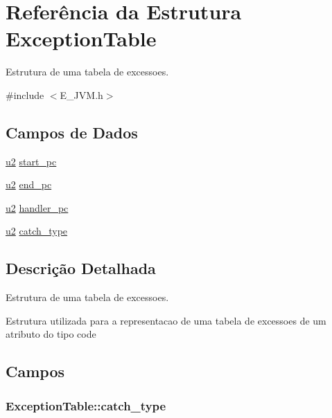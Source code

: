 \hypertarget{struct_exception_table}{}\section{Referência da Estrutura Exception\+Table}
\label{struct_exception_table}


Estrutura de uma tabela de excessoes.  




{\ttfamily \#include $<$E\+\_\+\+J\+V\+M.\+h$>$}

\subsection*{Campos de Dados}
\begin{DoxyCompactItemize}
\item 
\hyperlink{_e___j_v_m_8h_a5f223212eef04d10a4550ded680cb1cf}{u2} \hyperlink{struct_exception_table_af137b3a966825f91146039797d3b1ba5}{start\+\_\+pc}
\item 
\hyperlink{_e___j_v_m_8h_a5f223212eef04d10a4550ded680cb1cf}{u2} \hyperlink{struct_exception_table_ac2df73606ebe48af50a629f83fe9c677}{end\+\_\+pc}
\item 
\hyperlink{_e___j_v_m_8h_a5f223212eef04d10a4550ded680cb1cf}{u2} \hyperlink{struct_exception_table_a664ec4b395e02d3a5bfa6cef3493c1e7}{handler\+\_\+pc}
\item 
\hyperlink{_e___j_v_m_8h_a5f223212eef04d10a4550ded680cb1cf}{u2} \hyperlink{struct_exception_table_a440736a74baddb4197715e85ef73b836}{catch\+\_\+type}
\end{DoxyCompactItemize}


\subsection{Descrição Detalhada}
Estrutura de uma tabela de excessoes. 

Estrutura utilizada para a representacao de uma tabela de excessoes de um atributo do tipo code 

\subsection{Campos}
\hypertarget{struct_exception_table_a440736a74baddb4197715e85ef73b836}{}
\subsubsection[{catch\+\_\+type}]{ Exception\+Table\+::catch\+\_\+type}\label{struct_exception_table_a440736a74baddb4197715e85ef73b836}
\hypertarget{struct_exception_table_ac2df73606ebe48af50a629f83fe9c677}{}
